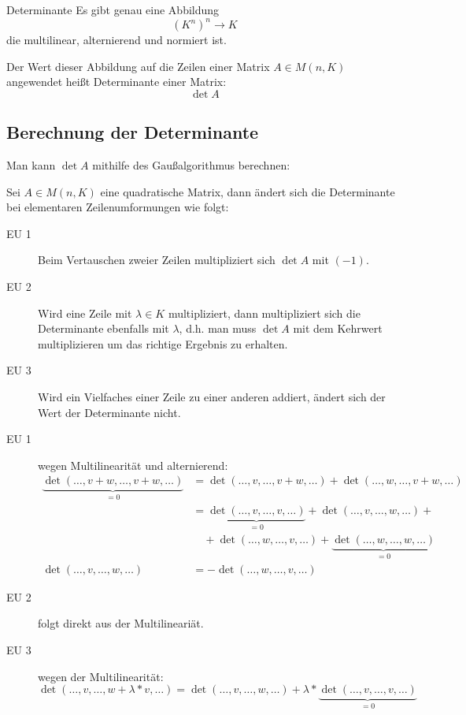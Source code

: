 \begin{definition}{Determinante}
	Es gibt genau eine Abbildung
	\begin{equation*}
		(K^n)^n\rightarrow K
	\end{equation*}
	die multilinear, alternierend und normiert ist.

	Der Wert dieser Abbildung auf die Zeilen einer Matrix $A\in M(n,K)$ angewendet heißt Determinante einer Matrix:
	\begin{equation*}
		\det A
	\end{equation*}
\end{definition}


\subsection{Berechnung der Determinante}
Man kann $\det A$ mithilfe des Gaußalgorithmus berechnen:
\begin{satz}{}
	Sei $A\in M(n,K)$ eine quadratische Matrix, dann ändert sich die Determinante bei elementaren Zeilenumformungen wie folgt:
	\begin{description}
		\item[EU 1] Beim Vertauschen zweier Zeilen multipliziert sich $\det A$ mit $(-1)$.
		\item[EU 2] Wird eine Zeile mit $\lambda \in K$ multipliziert, dann multipliziert sich die Determinante ebenfalls mit $\lambda$, d.h. man muss $\det A$ mit dem Kehrwert multiplizieren um das richtige Ergebnis zu erhalten.
		\item[EU 3] Wird ein Vielfaches einer Zeile zu einer anderen addiert, ändert sich der Wert der Determinante nicht.
	\end{description}
\end{satz}
\beweis
\begin{description}
	\item[EU 1] wegen Multilinearität und alternierend:
	\begin{align*}
		\underbrace{\det(\ldots,v+w,\ldots,v+w,\ldots)}_{=0} &= \det(\ldots,v,\ldots, v+w,\ldots)+\det(\ldots,w,\ldots, v+w,\ldots)\\
																&= \underbrace{\det(\ldots,v,\ldots, v,\ldots)}_{=0}+\det(\ldots,v,\ldots, w,\ldots)+\\
																&\quad +\det(\ldots,w,\ldots, v,\ldots)+\underbrace{\det(\ldots,w,\ldots, w,\ldots)}_{=0}\\
		\det(\ldots,v,\ldots, w,\ldots)		&=-\det(\ldots,w,\ldots, v,\ldots)
	\end{align*}
	\item[EU 2] folgt direkt aus der Multilineariät.
	\item[EU 3] wegen der Multilinearität:
	\begin{equation*}
		\det(\ldots,v,\ldots, w+\lambda*v,\ldots)=\det(\ldots,v,\ldots, w,\ldots)+\lambda*\underbrace{\det(\ldots,v,\ldots, v,\ldots)}_{=0}
	\end{equation*}
\end{description}

